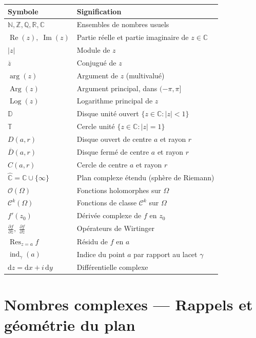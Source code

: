 \documentclass[12pt,a4paper,openany]{book}
\theoremstyle{definition}
\theoremstyle{plain}
\theoremstyle{remark}
\newcommand{\C}{\mathbb{C}}
\newcommand{\R}{\mathbb{R}}
\newcommand{\Z}{\mathbb{Z}}
\newcommand{\N}{\mathbb{N}}
\newcommand{\Q}{\mathbb{Q}}
\newcommand{\D}{\mathbb{D}}
\newcommand{\T}{\mathbb{T}}
\DeclareMathOperator{\re}{Re}
\DeclareMathOperator{\im}{Im}
\DeclareMathOperator{\Arg}{Arg}
\DeclareMathOperator{\Log}{Log}
\DeclareMathOperator{\Res}{Res}
\DeclareMathOperator{\ind}{ind}
\newcommand{\dd}{\mathrm{d}}
\newcommand{\abs}[1]{\left|#1\right|}
\newcommand{\conj}[1]{\overline{#1}}
\begin{document}
\begin{tabular}{@{}ll@{}}
\toprule
\textbf{Symbole} & \textbf{Signification} \\
\midrule
$\N, \Z, \Q, \R, \C$ & Ensembles de nombres usuels \\
$\re(z),\; \im(z)$ & Partie réelle et partie imaginaire de $z \in \C$ \\
$\abs{z}$ & Module de $z$ \\
$\conj{z}$ & Conjugué de $z$ \\
$\arg(z)$ & Argument de $z$ (multivalué) \\
$\Arg(z)$ & Argument principal, dans $(-\pi,\pi]$ \\
$\Log(z)$ & Logarithme principal de $z$ \\
$\D$ & Disque unité ouvert $\{z \in \C : \abs{z} < 1\}$ \\
$\T$ & Cercle unité $\{z \in \C : \abs{z} = 1\}$ \\
$D(a,r)$ & Disque ouvert de centre $a$ et rayon $r$ \\
$\conj{D}(a,r)$ & Disque fermé de centre $a$ et rayon $r$ \\
$C(a,r)$ & Cercle de centre $a$ et rayon $r$ \\
$\hat{\C} = \C \cup \{\infty\}$ & Plan complexe étendu (sphère de Riemann) \\
$\mathscr{O}(\Omega)$ & Fonctions holomorphes sur $\Omega$ \\
$\mathscr{C}^k(\Omega)$ & Fonctions de classe $\mathscr{C}^k$ sur $\Omega$ \\
$f'(z_0)$ & Dérivée complexe de $f$ en $z_0$ \\
$\frac{\partial f}{\partial z},\;\frac{\partial f}{\partial \conj{z}}$ & Opérateurs de Wirtinger \\
$\Res_{z=a} f$ & Résidu de $f$ en $a$ \\
$\ind_\gamma(a)$ & Indice du point $a$ par rapport au lacet $\gamma$ \\
$\dd z = \dd x + i\,\dd y$ & Différentielle complexe \\
\bottomrule
\end{tabular}

\chapter{Nombres complexes --- Rappels et géométrie du plan}\label{ch:nombres-complexes}
\end{document}

